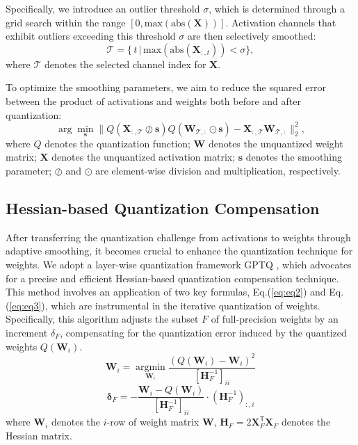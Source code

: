 Specifically, we introduce an outlier threshold $\sigma$, which is determined through a grid search within the range $[0, \mbox{max}(\mbox{abs}(\mathbf{X}))]$. Activation channels that exhibit outliers exceeding this threshold $\sigma$ are then selectively smoothed:
\begin{equation}
    \mathcal{T}=\{\,t\,|\,\mbox{max}(\mbox{abs}(\mathbf{X}_{:, t}))<\sigma \},
    \label{eq:selct_channel}
\end{equation}
where $\mathcal{T}$ denotes the selected channel index for $\mathbf{X}$.

To optimize the smoothing parameters, we aim to reduce the squared error between the product of activations and weights both before and after quantization:
\begin{equation}
\arg\min_{\mathbf{s}}\|Q(\mathbf{X}_{:,\mathcal{T}} \oslash \mathbf{s})Q(\mathbf{W}_{\mathcal{T}, :} \odot \mathbf{s})- \mathbf{X}_{:,\mathcal{T}}\mathbf{W}_{\mathcal{T}, :}\|_2^2,
\end{equation}
where $Q$ denotes the quantization function;
$\mathbf{W}$ denotes the unquantized weight matrix;
$\mathbf{X}$ denotes the unquantized activation matrix;
$\mathbf{s}$ denotes the smoothing parameter;
$\oslash$ and $\odot$ are element-wise division and multiplication, respectively.

\subsection{Hessian-based Quantization Compensation}
After transferring the quantization challenge from activations to weights through adaptive smoothing, it becomes crucial to enhance the quantization technique for weights. We adopt a layer-wise quantization framework GPTQ \citep{frantar2022gptq}, which advocates for a precise and efficient Hessian-based quantization compensation technique. This method involves an application of two key formulas, Eq.(\ref{eq:eq2}) and Eq.(\ref{eq:eq3}), which are instrumental in the iterative quantization of weights. Specifically, this algorithm adjusts the subset $F$ of full-precision weights by an increment $\delta_F$, compensating for the quantization error induced by the quantized weights $Q(\textbf{W}_i)$.
\begin{equation}
    \mathbf{W}_i = \mathop{\mbox{argmin}}\limits_{\mathbf{W}_i}\frac{(Q(\textbf{W}_i) - \textbf{W}_i)^2}{[\mathbf{H}_{F}^{-1}]_{ii}} \label{eq:eq2}
\end{equation}
\begin{equation}
    \bm{\delta}_F = - \frac{\textbf{W}_i - Q(\textbf{W}_i)}{[\mathbf{H}_{F}^{-1}]_{ii}} \cdot (\mathbf{H}_{F}^{-1})_{:,i} \label{eq:eq3}
\end{equation}
where $\textbf{W}_i$ denotes the $i$-row of weight matrix $\mathbf{W}$, $\mathbf{H}_{F} = 2\textbf{X}_F^\mathsf{T}\textbf{X}_F$ denotes the Hessian matrix.

